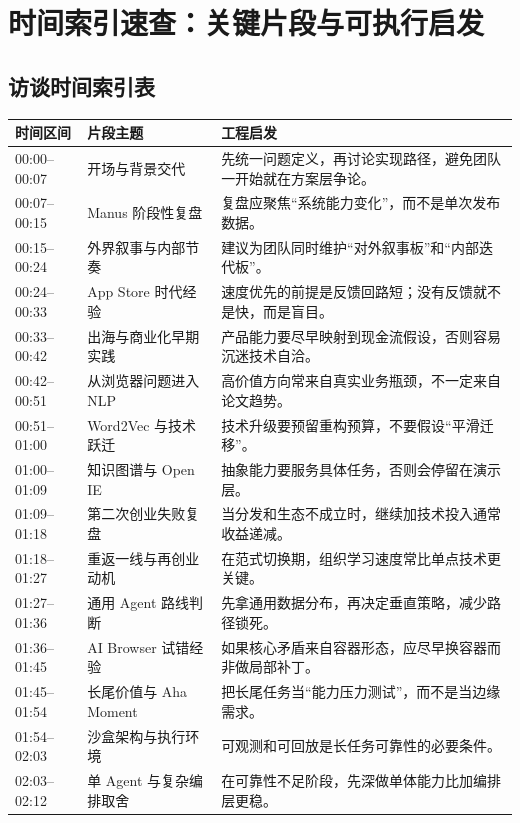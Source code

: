 \section{时间索引速查：关键片段与可执行启发}

\subsection{访谈时间索引表}

\begin{longtable}{p{2.6cm}p{4.0cm}p{6.6cm}}
\toprule
时间区间 & 片段主题 & 工程启发 \\
\midrule
\endhead
00:00--00:07 & 开场与背景交代 & 先统一问题定义，再讨论实现路径，避免团队一开始就在方案层争论。 \\
00:07--00:15 & Manus 阶段性复盘 & 复盘应聚焦“系统能力变化”，而不是单次发布数据。 \\
00:15--00:24 & 外界叙事与内部节奏 & 建议为团队同时维护“对外叙事板”和“内部迭代板”。 \\
00:24--00:33 & App Store 时代经验 & 速度优先的前提是反馈回路短；没有反馈就不是快，而是盲目。 \\
00:33--00:42 & 出海与商业化早期实践 & 产品能力要尽早映射到现金流假设，否则容易沉迷技术自洽。 \\
00:42--00:51 & 从浏览器问题进入 NLP & 高价值方向常来自真实业务瓶颈，不一定来自论文趋势。 \\
00:51--01:00 & Word2Vec 与技术跃迁 & 技术升级要预留重构预算，不要假设“平滑迁移”。 \\
01:00--01:09 & 知识图谱与 Open IE & 抽象能力要服务具体任务，否则会停留在演示层。 \\
01:09--01:18 & 第二次创业失败复盘 & 当分发和生态不成立时，继续加技术投入通常收益递减。 \\
01:18--01:27 & 重返一线与再创业动机 & 在范式切换期，组织学习速度常比单点技术更关键。 \\
01:27--01:36 & 通用 Agent 路线判断 & 先拿通用数据分布，再决定垂直策略，减少路径锁死。 \\
01:36--01:45 & AI Browser 试错经验 & 如果核心矛盾来自容器形态，应尽早换容器而非做局部补丁。 \\
01:45--01:54 & 长尾价值与 Aha Moment & 把长尾任务当“能力压力测试”，而不是当边缘需求。 \\
01:54--02:03 & 沙盒架构与执行环境 & 可观测和可回放是长任务可靠性的必要条件。 \\
02:03--02:12 & 单 Agent 与复杂编排取舍 & 在可靠性不足阶段，先深做单体能力比加编排层更稳。 \\

\end{longtable}
